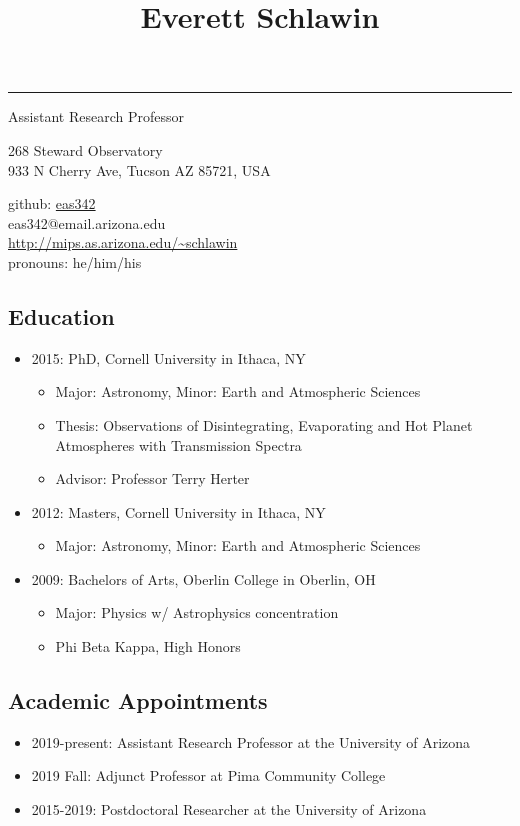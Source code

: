 \documentclass[11pt, oneside]{article}   	%
\title{Everett Schlawin}
\date{}							%
\begin{document}
\maketitle
\vspace{-0.85in}
\begin{centering}
\rule{6in}{0.03in}
Assistant Research Professor

268 Steward Observatory\\
933 N Cherry Ave, Tucson AZ 85721, USA

github: \href{https://github.com/eas342}{eas342}\\
eas342@email.arizona.edu\\
\url{http://mips.as.arizona.edu/~schlawin}\\
pronouns: he/him/his

\end{centering}

\subsection*{Education}
\begin{itemize}[noitemsep]
	\item 2015: PhD, Cornell University in Ithaca, NY
		\begin{itemize}[noitemsep]
		\item Major: Astronomy, Minor: Earth and Atmospheric Sciences
		\item Thesis: Observations of Disintegrating, Evaporating and Hot Planet Atmospheres with Transmission Spectra
		\item Advisor: Professor Terry Herter
		\end{itemize}
	\item 2012: Masters, Cornell University in Ithaca, NY
		\begin{itemize}[noitemsep]
		\item Major: Astronomy, Minor: Earth and Atmospheric Sciences
		\end{itemize}
	\item 2009: Bachelors of Arts, Oberlin College in Oberlin, OH
		\begin{itemize}[noitemsep]
		\item Major: Physics w/ Astrophysics concentration
		\item Phi Beta Kappa, High Honors
		\end{itemize}
\end{itemize}

\subsection*{Academic Appointments}
\begin{itemize}[noitemsep]
	\item 2019-present: Assistant Research Professor at the University of Arizona
	\item 2019 Fall: Adjunct Professor at Pima Community College
	\item 2015-2019: Postdoctoral Researcher at the University of Arizona
\end{itemize}
\end{document}
